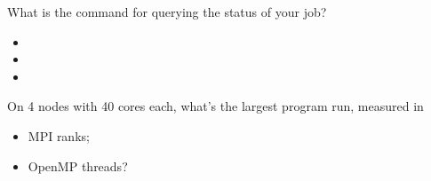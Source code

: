 \begin{exercise}
  What is the command for querying the status of your job?
  \begin{itemize}
  \item {}
  \item {}
  \item {}
  \end{itemize}
\end{exercise}

\begin{exercise}
  On 4 nodes with 40 cores each, what's the largest program run,
  measured in
  \begin{itemize}
  \item MPI ranks;
  \item OpenMP threads?
  \end{itemize}
\end{exercise}

